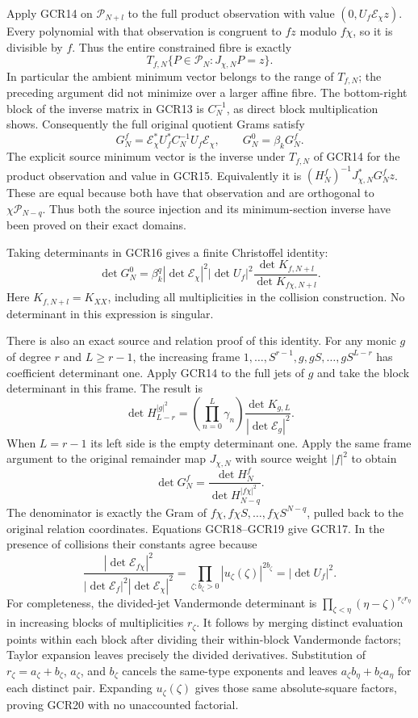Apply GCR14 on $\mathcal P_{N+l}$ to the full product observation
with value $(0,U_f\mathcal E_\chi z)$. Every polynomial with
that observation is congruent to $fz$ modulo $f\chi$, so it is
divisible by $f$. Thus the entire constrained fibre is exactly
\[
 T_{f,N}\{P\in\mathcal P_N:J_{\chi,N}P=z\}.
\tag{GCR15}
\]
In particular the ambient minimum vector belongs to the range
of $T_{f,N}$; the preceding argument did not minimize over a
larger affine fibre. The bottom-right block of the inverse
matrix in GCR13 is $C_N^{-1}$, as direct block multiplication
shows. Consequently the full original quotient Grams satisfy
\[
 \boxed{\quad
 G_N^f=\mathcal E_\chi^*U_f^*C_N^{-1}U_f\mathcal E_\chi,
 \qquad G_N^0=\beta_k G_N^f.
 \quad}\tag{GCR16}
\]
The explicit source minimum vector is the inverse under $T_{f,N}$
of GCR14 for the product observation and value in GCR15.
Equivalently it is
$(H_N^f)^{-1}J_{\chi,N}^*G_N^f z$. These are equal because both
have that observation and are orthogonal to
$\chi\mathcal P_{N-q}$. Thus both the source injection and its
minimum-section inverse have been proved on their exact domains.

Taking determinants in GCR16 gives a finite Christoffel identity:
\[
 \det G_N^0
 =\beta_k^q|\det\mathcal E_\chi|^2|\det U_f|^2
                  \frac{\det K_{f,N+l}}{\det K_{f\chi,N+l}}.
\tag{GCR17}
\]
Here $K_{f,N+l}=K_{XX}$, including all multiplicities in the
collision construction. No determinant in this expression is
singular.

There is also an exact source and relation proof of this identity.
For any monic $g$ of degree $r$ and $L\geq r-1$, the increasing
frame
$1,\ldots,S^{r-1},g,gS,\ldots,gS^{L-r}$
has coefficient determinant one. Apply GCR14 to the full jets
of $g$ and take the block determinant in this frame. The result is
\[
 \det H^{|g|^2}_{L-r}
   =\left(\prod_{n=0}^L\gamma_n\right)
           \frac{\det K_{g,L}}{|\det\mathcal E_g|^2}.
\tag{GCR18}
\]
When $L=r-1$ its left side is the empty determinant one.
Apply the same frame argument to the original remainder map
$J_{\chi,N}$ with source weight $|f|^2$ to obtain
\[
 \det G_N^f
   =\frac{\det H^f_N}{\det H^{|f\chi|^2}_{N-q}}.
\tag{GCR19}
\]
The denominator is exactly the Gram of
$f\chi,f\chi S,\ldots,f\chi S^{N-q}$, pulled back to the
original relation coordinates. Equations GCR18--GCR19 give
GCR17. In the presence of collisions their constants agree
because
\[
 \frac{|\det\mathcal E_{f\chi}|^2}
      {|\det\mathcal E_f|^2|\det\mathcal E_\chi|^2}
       =\prod_{\zeta:b_\zeta>0}|u_\zeta(\zeta)|^{2b_\zeta}
       =|\det U_f|^2.
\tag{GCR20}
\]
For completeness, the divided-jet Vandermonde determinant is
$\prod_{\zeta<\eta}(\eta-\zeta)^{r_\zeta r_\eta}$
in increasing blocks of multiplicities $r_\zeta$.
It follows by merging distinct evaluation points within each
block after dividing their within-block Vandermonde factors;
Taylor expansion leaves precisely the divided derivatives.
Substitution of $r_\zeta=a_\zeta+b_\zeta$, $a_\zeta$, and
$b_\zeta$ cancels the same-type exponents and leaves
$a_\zeta b_\eta+b_\zeta a_\eta$ for each distinct pair.
Expanding $u_\zeta(\zeta)$ gives those same absolute-square
factors, proving GCR20 with no unaccounted factorial.

